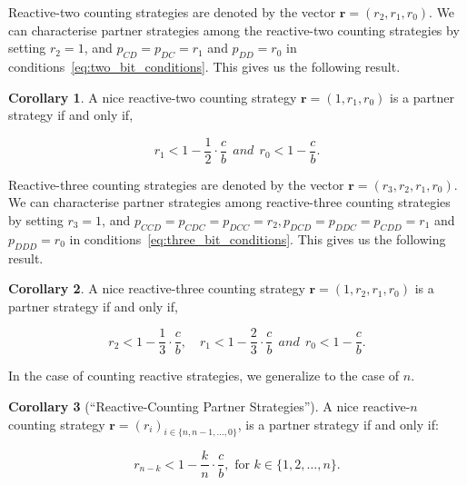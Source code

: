 \documentclass{article}
\theoremstyle{definition}
\newtheorem{corollary}{Corollary}[theorem]
\begin{document}
Reactive-two counting strategies are denoted by the vector $\mathbf{r}=(r_2,
r_1, r_0)$. We can characterise partner strategies among the reactive-two
counting strategies by setting $r_2 = 1$, and $p_{CD} = p_{DC} = r_1$ and
$p_{DD} = r_0$ in conditions~\eqref{eq:two_bit_conditions}. This gives us the
following result.

\begin{corollary}
A nice reactive-two counting strategy $\mathbf{r} = (1, r_1, r_0)$ is a partner strategy if and only if,

\begin{equation}\label{eq:counting_two_bit_conditions}
  \displaystyle r_1 < 1-\frac{1}{2} \cdot \frac{c}{b} ~~and~~ r_0 < 1\!-\! \frac{c}{b}.
\end{equation}
\end{corollary}

Reactive-three counting strategies are denoted by the vector $\mathbf{r}=(r_3,
r_2, r_1, r_0)$. We can characterise partner strategies among reactive-three
counting strategies by setting $r_3 = 1$, and $p_{CCD} = p_{CDC} = p_{DCC} =
r_2, p_{DCD} = p_{DDC} = p_{CDD} = r_1$ and $p_{DDD} = r_0$ in
conditions~\eqref{eq:three_bit_conditions}. This gives us the following result.

\begin{corollary}
A nice reactive-three counting strategy $\mathbf{r} = (1, r_2, r_1, r_0)$ is a partner strategy if and only if,

\begin{equation}\label{eq:counting_three_bit_conditions}
  \displaystyle r_2 < 1- \frac{1}{3} \cdot \frac{c}{b}, \quad r_1 < 1- \frac{2}{3} \cdot \frac{c}{b} ~~and~~ r_0 < 1\!-\! \frac{c}{b}.
\end{equation}
\end{corollary}

In the case of counting reactive strategies, we generalize to the case of $n$.

\begin{corollary}[``Reactive-Counting Partner Strategies'']\label{corollary:reactive_counting_partner_strategies}
A nice reactive-$n$ counting strategy $\mathbf{r}=(r_i)_{i \in \{n, n-1, \dots, 0\}}$,
is a partner strategy if and only if:

\begin{equation}
  r_{n - k} < 1 - \frac{k}{n} \cdot \frac{c}{b}, \text{ for } k \in \{1, 2, \dots, n\}.
\end{equation}

\end{corollary}
\end{document}
